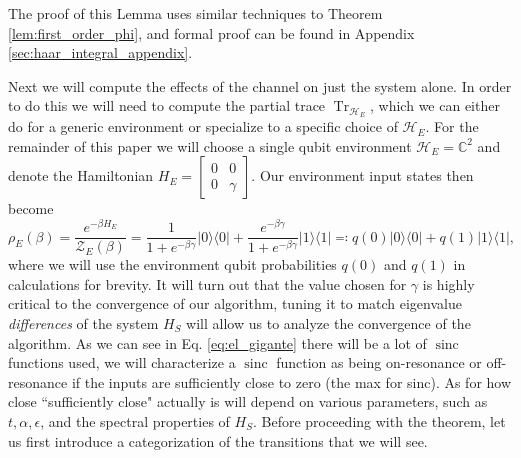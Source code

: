 \documentclass{article}
\newcommand{\ketbra}[2]{| #1\rangle\! \langle #2|}
\DeclareMathOperator{\Tr}{Tr}
\newcommand{\hilb}{\mathcal{H}}
\newcommand{\partfun}{\mathcal{Z}}
\DeclareMathOperator{\sinc}{sinc}
\begin{document}
\noindent The proof of this Lemma uses similar techniques to Theorem \ref{lem:first_order_phi}, and formal proof can be found in Appendix \ref{sec:haar_integral_appendix}.

Next we will compute the effects of the channel on just the system alone. In order to do this we will need to compute the partial trace $\Tr_{\hilb_E}$, which we can either do for a generic environment or specialize to a specific choice of $\hilb_E$. For the remainder of this paper we will choose a single qubit environment $\hilb_E = \mathbb{C}^2$ and denote the Hamiltonian $H_E = \begin{bmatrix} 0 & 0 \\ 0 & \gamma \end{bmatrix}$. Our environment input states then become
\begin{equation}
    \rho_E(\beta) = \frac{e^{-\beta H_E}}{\partfun_E(\beta)} = \frac{1}{1 + e^{-\beta \gamma}} \ketbra{0}{0} + \frac{e^{-\beta \gamma}}{1 + e^{-\beta \gamma}} \ketbra{1}{1} \eqqcolon q(0) \ketbra{0}{0} + q(1) \ketbra{1}{1} \label{eq:env_state_def},
\end{equation}
where we will use the environment qubit probabilities $q(0)$ and $q(1)$ in calculations for brevity. It will turn out that the value chosen for $\gamma$ is highly critical to the convergence of our algorithm, tuning it to match eigenvalue \emph{differences} of the system $H_S$ will allow us to analyze the convergence of the algorithm. As we can see in Eq. \eqref{eq:el_gigante} there will be a lot of $\sinc$ functions used, we will characterize a $\sinc$ function as being on-resonance or off-resonance if the inputs are sufficiently close to zero (the max for sinc). As for how close ``sufficiently close" actually is will depend on various parameters, such as $t, \alpha, \epsilon$, and the spectral properties of $H_S$.   Before proceeding with the theorem, let us first introduce a categorization of the transitions that we will see.
\end{document}
